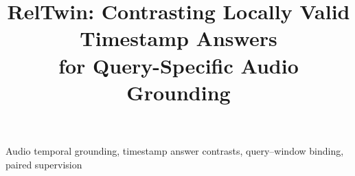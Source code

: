 \documentclass[10pt,letterpaper]{article}
\title{\fontsize{14}{16}\selectfont RelTwin: Contrasting Locally Valid Timestamp Answers\\for Query-Specific Audio Grounding}
\begin{document}
\maketitle

\begin{keywords}
Audio temporal grounding, timestamp answer contrasts, query--window binding, paired supervision
\end{keywords}






\clearpage



\end{document}
